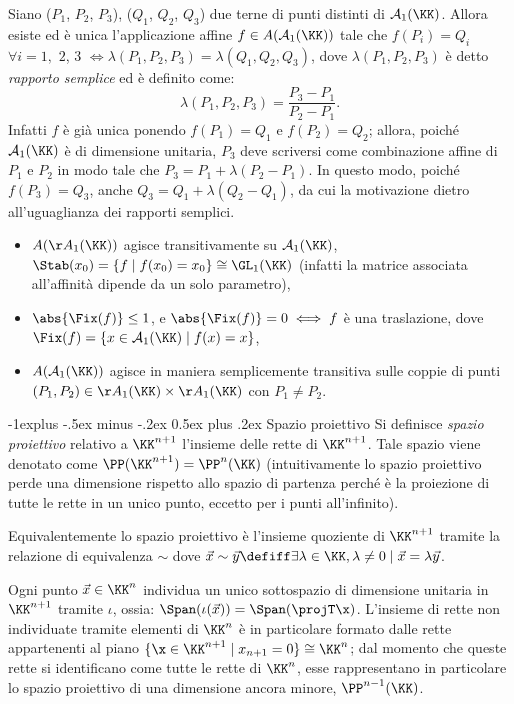 \documentclass[10pt,landscape]{article}
\makeatletter
\renewcommand{\subsection}{\@startsection{subsection}{2}{0mm}%
	{-1explus -.5ex minus -.2ex}%
	{0.5ex plus .2ex}%
	{\normalfont\normalsize\bfseries}}
\makeatother
\begin{document}
\begin{multicols}{3}
        Siano ($P_1$, $P_2$, $P_3$), ($Q_1$, $Q_2$, $Q_3$) due terne di punti distinti di $\mathcal{A}_1(\KK)$. Allora esiste ed è unica l'applicazione affine $f \in A(\mathcal{A}_1(\KK))$ tale che $f(P_i)=Q_i$ $\forall i=1,$ $2$, $3$ $\iff \lambda(P_1, P_2, P_3)=\lambda(Q_1, Q_2, Q_3)$, dove $\lambda(P_1,P_2,P_3)$ è detto \textit{rapporto semplice} ed è definito come:
        \[ \lambda(P_1, P_2, P_3) = \frac{P_3 - P_1}{P_2 - P_1}. \]
        Infatti $f$ è già unica ponendo $f(P_1) = Q_1$ e $f(P_2) = Q_2$; allora, poiché
        $\mathcal{A}_1(\KK)$ è di dimensione unitaria, $P_3$ deve scriversi come combinazione
        affine di $P_1$ e $P_2$ in modo tale che $P_3 = P_1 + \lambda (P_2 - P_1)$. In questo
        modo, poiché $f(P_3) = Q_3$, anche $Q_3 = Q_1 + \lambda (Q_2 - Q_1)$, da cui la
        motivazione dietro all'uguaglianza dei rapporti semplici.

		\begin{itemize}
			\item $A(\AA_1(\KK))$ agisce transitivamente su $\mathcal{A}_1(\KK)$,
			$\Stab(x_0)=\{f\mid f(x_0)=x_0\} \cong \GL_1(\KK)$ (infatti la matrice associata all'affinità dipende da un solo parametro),
			\item $\abs{\Fix(f)} \leq 1$, e
			$\abs{\Fix(f)}=0 \iff f$ è una traslazione, dove $\Fix(f) = \{x\in \mathcal{A}_1(\KK)\mid f(x)=x\}$,
			\item $A(\mathcal{A}_1(\KK))$ agisce in maniera semplicemente transitiva sulle coppie di punti $(P_1,P_2) \in \AA_1(\KK) \times \AA_1(\KK)$ con $P_1\neq P_2$.
		\end{itemize}
        
        \subsection{Spazio proiettivo}
        Si definisce \textit{spazio proiettivo} relativo a $\KK^{n+1}$ l'insieme delle rette di $\KK^{n+1}$. Tale spazio viene denotato come $\PP(\KK^{n+1})=\PP^n(\KK)$ (intuitivamente lo spazio proiettivo perde una dimensione rispetto allo spazio di partenza perché è la proiezione di tutte le rette in un unico punto, eccetto per i punti all'infinito).
        
        Equivalentemente lo spazio proiettivo è l'insieme quoziente di $\KK^{n+1}$ tramite
        la relazione di equivalenza $\sim$ dove $\vec x \sim \vec y \defiff \exists \lambda \in \KK, \lambda \neq 0 \mid \vec x = \lambda \vec y$.  

        Ogni punto $\vec x \in \KK^n$ individua un unico sottospazio di dimensione unitaria in $\KK^{n+1}$ tramite $\iota$, ossia: $\Span(\iota(\vec x)) = \Span(\projT\x)$. L'insieme di rette non individuate tramite elementi di $\KK^n$ è in particolare formato dalle rette appartenenti al piano $\{\x \in \KK^{n+1} \mid x_{n+1}=0\}\cong \KK^n$; dal momento che queste rette si identificano come tutte le rette di $\KK^n$, esse rappresentano in particolare lo spazio proiettivo di una dimensione ancora minore, $\PP^{n-1}(\KK)$.


\end{multicols}
\end{document}
